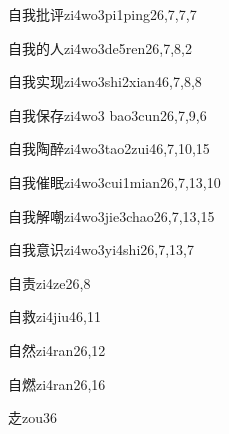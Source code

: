 \begin{verbete}{自我批评}{zi4wo3pi1ping2}{6,7,7,7}
\end{verbete}

\begin{verbete}{自我的人}{zi4wo3de5ren2}{6,7,8,2}
\end{verbete}

\begin{verbete}{自我实现}{zi4wo3shi2xian4}{6,7,8,8}
\end{verbete}

\begin{verbete}{自我保存}{zi4wo3 bao3cun2}{6,7,9,6}
\end{verbete}

\begin{verbete}{自我陶醉}{zi4wo3tao2zui4}{6,7,10,15}
\end{verbete}

\begin{verbete}{自我催眠}{zi4wo3cui1mian2}{6,7,13,10}
\end{verbete}

\begin{verbete}{自我解嘲}{zi4wo3jie3chao2}{6,7,13,15}
\end{verbete}

\begin{verbete}{自我意识}{zi4wo3yi4shi2}{6,7,13,7}
\end{verbete}

\begin{verbete}{自责}{zi4ze2}{6,8}
\end{verbete}

\begin{verbete}{自救}{zi4jiu4}{6,11}
\end{verbete}

\begin{verbete}{自然}{zi4ran2}{6,12}
\end{verbete}

\begin{verbete}{自燃}{zi4ran2}{6,16}
\end{verbete}

\begin{verbete}{赱}{zou3}{6}
\end{verbete}



